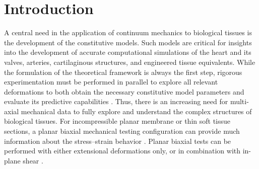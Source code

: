 \section{Introduction}
    A central need in the application of continuum mechanics to biological tissues is the development of the constitutive models. Such models are critical for insights into the development of accurate computational simulations of the heart and its valves, arteries, cartilaginous structures, and engineered tissue equivalents. While the formulation of the theoretical framework is always the first step, rigorous experimentation must be performed in parallel to explore all relevant deformations to both obtain the necessary constitutive model parameters and evaluate its predictive capabilities \cite{sacks_biaxial_2000}. Thus, there is an increasing need for multi-axial mechanical data to fully explore and understand the complex structures of biological tissues. For incompressible planar membrane or thin soft tissue sections, a planar biaxial mechanical testing configuration can provide much information about the stress–strain behavior \cite{sacks_biaxial_2000}. Planar biaxial tests can be performed with either extensional deformations only, or in combination with in-plane shear \cite{sun_biaxial_2003}.


